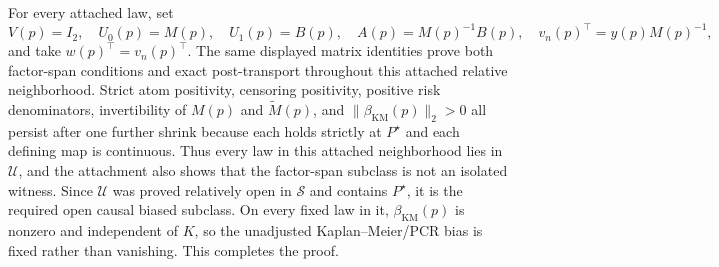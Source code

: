 For every attached law, set
\[
V(p)=I_2,\quad U_0(p)=M(p),\quad U_1(p)=B(p),\quad
A(p)=M(p)^{-1}B(p),\quad v_n(p)^\top=y(p)M(p)^{-1},
\]
and take \(w(p)^\top=v_n(p)^\top\). The same displayed matrix identities prove both factor-span conditions and exact post-transport throughout this attached relative neighborhood. Strict atom positivity, censoring positivity, positive risk denominators, invertibility of \(M(p)\) and \(\widetilde M(p)\), and \(\|\beta_{\mathrm{KM}}(p)\|_2>0\) all persist after one further shrink because each holds strictly at \(P^\star\) and each defining map is continuous. Thus every law in this attached neighborhood lies in \(\mathcal U\), and the attachment also shows that the factor-span subclass is not an isolated witness. Since \(\mathcal U\) was proved relatively open in \(\mathcal S\) and contains \(P^\star\), it is the required open causal biased subclass. On every fixed law in it, \(\beta_{\mathrm{KM}}(p)\) is nonzero and independent of \(K\), so the unadjusted Kaplan--Meier/PCR bias is fixed rather than vanishing. This completes the proof.
